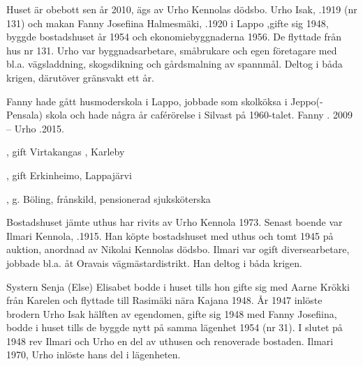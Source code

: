 
Huset är obebott sen år 2010, ägs av Urho Kennolas dödsbo. Urho Isak, .1919 (nr 131) och makan Fanny Josefiina Halmesmäki, .1920 i Lappo ,gifte sig 1948, byggde bostadshuset år 1954 och ekonomiebyggnaderna 1956. De flyttade från hus nr 131. Urho var byggnadsarbetare, småbrukare och egen företagare med bl.a. vägsladdning, skogsdikning och gårdsmalning av spannmål. Deltog i båda krigen, därutöver gränsvakt ett år.


Fanny hade gått husmoderskola i Lappo, jobbade som skolköksa i Jeppo(-Pensala) skola och hade några år caférörelse i Silvast på 1960-talet. Fanny . 2009  --  Urho .2015.
\begin{jhchildren}
  \item {}, gift Virtakangas , Karleby
  \item {}, gift Erkinheimo, Lappajärvi
  \item {}, g. Böling, frånskild, pensionerad sjuksköterska
\end{jhchildren}




Bostadshuset jämte uthus har rivits av Urho Kennola 1973. Senast boende var Ilmari Kennola, .1915. Han köpte bostadshuset med uthus och tomt 1945 på auktion, anordnad av Nikolai Kennolas dödsbo. Ilmari var ogift diversearbetare, jobbade bl.a. åt Oravais vägmästardistrikt. Han deltog i båda krigen.

Systern Senja (Else) Elisabet bodde i huset tills hon gifte sig med Aarne Krökki från Karelen och flyttade till Rasimäki nära Kajana 1948. År 1947 inlöste brodern Urho Isak hälften av egendomen, gifte sig 1948 med Fanny Josefiina, bodde i  huset tills de byggde nytt på samma lägenhet 1954 (nr 31). I slutet på 1948 rev Ilmari och Urho en del av uthusen och  renoverade bostaden.
Ilmari  1970, Urho inlöste hans del i lägenheten.


